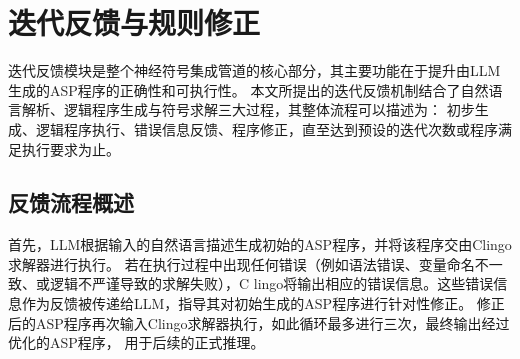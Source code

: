 \begin{table}[h]
    \centering
    \renewcommand{\arraystretch}{1.2}
    \setlength{\tabcolsep}{5pt}
    \caption{不同模型在各问题类型上的语法正确率和语义正确率的对比}
    \label{tab:semantics_comparison}
\end{table}
\section{迭代反馈与规则修正}
迭代反馈模块是整个神经符号集成管道的核心部分，其主要功能在于提升由LLM生成的ASP程序的正确性和可执行性。
本文所提出的迭代反馈机制结合了自然语言解析、逻辑程序生成与符号求解三大过程，其整体流程可以描述为：
初步生成、逻辑程序执行、错误信息反馈、程序修正，直至达到预设的迭代次数或程序满足执行要求为止。
\subsection{反馈流程概述}
首先，LLM根据输入的自然语言描述生成初始的ASP程序，并将该程序交由Clingo求解器进行执行。
若在执行过程中出现任何错误（例如语法错误、变量命名不一致、或逻辑不严谨导致的求解失败），C
lingo将输出相应的错误信息。这些错误信息作为反馈被传递给LLM，指导其对初始生成的ASP程序进行针对性修正。
修正后的ASP程序再次输入Clingo求解器执行，如此循环最多进行三次，最终输出经过优化的ASP程序，
用于后续的正式推理。
